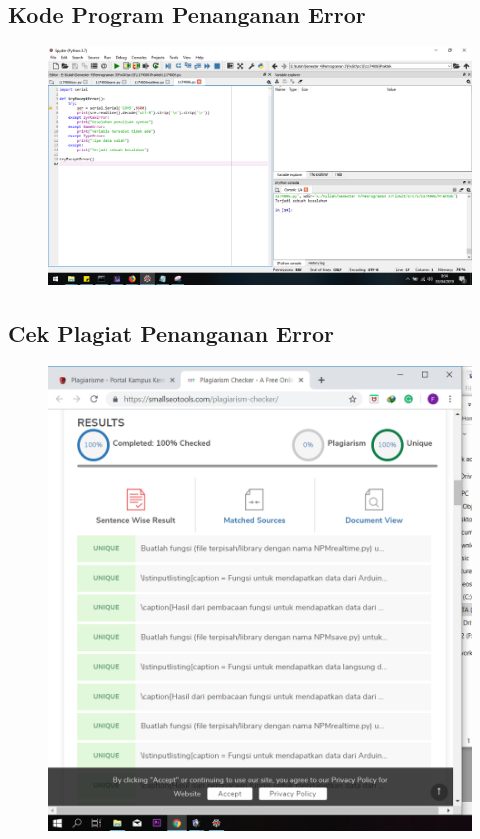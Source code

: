 \subsection{Kode Program Penanganan Error}
\begin{figure}[H]
	\includegraphics[width=12cm]{figures/5/1174026/Praktek/error.png}
	\centering
\end{figure}

\subsection{Cek Plagiat Penanganan Error}
\begin{figure}[H]
	\includegraphics[width=12cm]{figures/5/1174026/Praktek/plagiat.png}
	\centering
\end{figure}